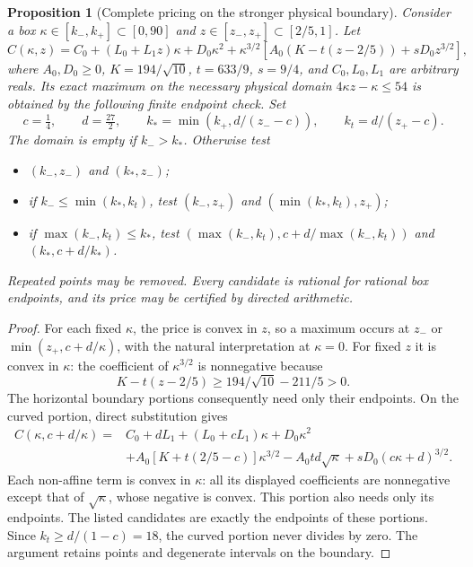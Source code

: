 \documentclass[11pt]{article}
\newtheorem{proposition}[theorem]{Proposition}
\begin{document}
\begin{proposition}[Complete pricing on the stronger physical boundary]
\label{prop:new-strong-curved-shape-price}
Consider a box $\kappa\in[k_-,k_+]\subset[0,90]$ and
$z\in[z_-,z_+]\subset[2/5,1]$.  Let
\[
 C(\kappa,z)=C_0+(L_0+L_1z)\kappa+D_0\kappa^2
 +\kappa^{3/2}\left[A_0(K-t(z-2/5))+sD_0z^{3/2}\right],
\]
where $A_0,D_0\geq0$, $K=194/\sqrt{10}$, $t=633/9$,
$s=9/4$, and $C_0,L_0,L_1$ are arbitrary reals.  Its exact maximum
on the necessary physical domain $4\kappa z-\kappa\leq54$ is
obtained by the following finite endpoint check.  Set
\[
 c=\tfrac14,\qquad d=\tfrac{27}{2},\qquad
 k_* =\min(k_+,d/(z_--c)),\qquad k_t=d/(z_+-c).
\]
The domain is empty if $k_->k_*$.  Otherwise test
\begin{itemize}
 \item $(k_-,z_-)$ and $(k_*,z_-)$;
 \item if $k_-\leq\min(k_*,k_t)$, test
       $(k_-,z_+)$ and $(\min(k_*,k_t),z_+)$;
 \item if $\max(k_-,k_t)\leq k_*$, test
       $(\max(k_-,k_t),c+d/\max(k_-,k_t))$
       and $(k_*,c+d/k_*)$.
\end{itemize}
Repeated points may be removed.  Every candidate is rational for
rational box endpoints, and its price may be certified by directed
arithmetic.
\end{proposition}
\begin{proof}
For each fixed $\kappa$, the price is convex in $z$, so a maximum
occurs at $z_-$ or $\min(z_+,c+d/\kappa)$, with the natural
interpretation at $\kappa=0$.  For fixed $z$ it is convex in
$\kappa$: the coefficient of $\kappa^{3/2}$ is nonnegative because
\[
 K-t(z-2/5)\geq194/\sqrt{10}-211/5>0.
\]
The horizontal boundary portions consequently need only their
endpoints.  On the curved portion, direct substitution gives
\begin{align*}
 C(\kappa,c+d/\kappa)={}&C_0+dL_1+(L_0+cL_1)\kappa+D_0\kappa^2\\
 &+A_0[K+t(2/5-c)]\kappa^{3/2}
       -A_0td\sqrt\kappa+sD_0(c\kappa+d)^{3/2}.
\end{align*}
Each non-affine term is convex in $\kappa$: all its displayed
coefficients are nonnegative except that of $\sqrt\kappa$, whose
negative is convex.  This portion also needs only its endpoints.
The listed candidates are exactly the endpoints of these portions.
Since $k_t\geq d/(1-c)=18$, the curved portion never divides by
zero.  The argument retains points and degenerate intervals on
the boundary.
\end{proof}
\end{document}
